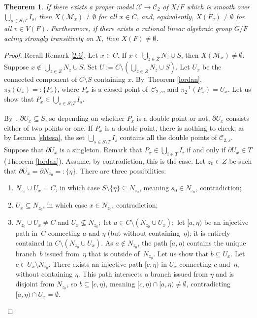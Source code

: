\documentclass[JEP,XML,SOM,Unicode,NoFloatCountersInSection,published]{cedram}
\let\backslash\setminus
\newtheorem{thm}{Theorem}[section]
\theoremstyle{definition}
\begin{document}
\begin{thm} \label{2.13}
If there exists a proper model $\mathcal{X} \to \mathscr{C}_2$ of $X/F$ which is smooth over $\bigcup_{s \in S \backslash T} I_s$, then $X(\mathscr{M}_x) \neq \emptyset$ for all $x \in C$, and, equivalently, $X(F_v) \neq \emptyset$ for all ${v \in V(F)}$.
Furthermore, if there exists a rational linear algebraic group $G/F$ acting strongly transitively on $X$, then $X(F) \neq \emptyset$.
\end{thm}

\begin{proof} Recall Remark \ref{2.6}.
Let $x \in C$. If $x \in \bigcup_{z \in Z}N_z \cup S$, then $X(\mathscr{M}_x) \neq \emptyset$. Suppose $x \not \in \bigcup_{z \in Z}N_z \cup S$. Set $U:=C \backslash (\bigcup_{z \in Z} N_z \cup S)$. Let $U_x$ be the connected component of $C \backslash S$ containing $x$. By~Theorem \ref{lordan}, $\pi_2(U_x)=:\{P_x\}$, where $P_x$ is a closed point of~$\mathscr{C}_{2,s}$, and ${\pi_2^{-1}(P_x)=U_x}$. Let us show that $P_x \in \bigcup_{s \in S\backslash T} I_s$.

By~\loccit, $\partial{U_x} \subseteq S$, so depending on whether $P_x$ is a double point or not, $\partial{U_x}$ consists either of two points or one.
If $P_x$ is a double point, there is nothing to check, as by Lemma \ref{shtesa}, the set $\bigcup_{s \in S \backslash T} I_s$ contains all the double points of $\mathscr{C}_{2,s}$.
Suppose that $\partial{U_x}$ is a singleton. Remark that $P_x \in \bigcup_{i \in T} I_i$ if and only if $\partial{U_x} \in T$ (\cf Theorem \ref{lordan}). Assume, by contradiction, this is the case. Let $z_0 \in Z$ be such that $\partial{U_x}=\partial{N_{z_0}}=:\{\eta\}$. There are three possibilities:

\begin{enumerate}
\item
$N_{z_0} \cup U_x=C$, in which case $S \backslash \{\eta\} \subseteq N_{z_0}$, meaning $s_0 \in N_{z_0}$, contradiction;

\item
$U_x \subseteq N_{z_0}$, in which case $x \in N_{z_0}$, contradiction;

\item
$N_{z_0} \cup U_x\neq C$ and $U_x \not \subseteq N_{z_0};$ let $a \in C \backslash (N_{z_0} \cup U_x);$ let $[a, \eta)$ be an injective path in~$C$ connecting $a$ and $\eta$ (but without containing~$\eta$); it is entirely contained in $C \backslash (N_{z_0} \cup U_x)$.
As $a \not \in N_{z_0}$, the path $[a,\eta)$ contains the unique branch~$b$ issued from~$\eta$ that is outside of~$N_{z_0}$. Let us show that $b \subseteq U_x$. Let $c \in U_x \backslash N_{z_0}$. There exists an injective path $[c, \eta)$ in $U_x$ connecting $c$ and~$\eta$, without containing $\eta$. This path intersects a branch issued from $\eta$ and is disjoint from $N_{z_0}$, so $b \subseteq [c, \eta)$, meaning $[c, \eta) \cap [a, \eta) \neq \emptyset$, contradicting $[a, \eta) \cap U_x=\emptyset$.
\end{enumerate}


\end{proof}
\end{document}
